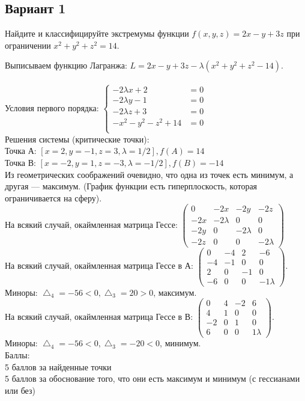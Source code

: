 \documentclass[addpoints, answers]{exam} %
\begin{document}
\subsection{Вариант 1}
\begin{questions}
\question[10] Найдите и классифицируйте экстремумы функции $f(x,y,z)=2x-y+3z$ при ограничении $x^2+y^2+z^2=14$.\\
\begin{solution}

Выписываем функцию Лагранжа: $L=2x-y+3z-\lambda (x^2+y^2+z^2-14)$.\\\\
Условия первого порядка:
$\left\{\begin{aligned}
-2\lambda x+2&=0\\
-2\lambda y-1&=0\\
-2\lambda z+3&=0\\
-x^2-y^2-z^2+14&=0\\
\end{aligned}\right.$\\
Решения системы (критические точки): \\
Точка А: $\left[ x=2,y=-1,z=3,\lambda=1/2\right], f(A)=14$\\
Точка В: $\left[ x=-2,y=1,z=-3,\lambda=-1/2\right], f(B)=-14$\\
Из геометрических соображений очевидно, что одна из точек есть минимум, а другая --- максимум. (График функции есть гиперплоскость, которая ограничивается на сферу).\\
На всякий случай, окаймленная матрица Гессе:
$\left(\begin{array}{cccc}
0 & -2x & -2y & -2z\\
-2x & -2\lambda & 0 & 0\\
-2y & 0 & -2\lambda & 0\\
-2z & 0 & 0 & -2\lambda
\end{array}\right)$\\
На всякий случай, окаймленная матрица Гессе в А: 
$\left(\begin{array}{cccc}
0 & -4 & 2 & -6\\
-4 & -1 & 0 & 0\\
2 & 0 & -1 & 0\\
-6 & 0 & 0 & -1\lambda
\end{array}\right)$.\\
Миноры: $\bigtriangleup_4=-56<0, \bigtriangleup_3=20>0$, максимум.\\
На всякий случай, окаймленная матрица Гессе в В: 
$\left(\begin{array}{cccc}
0 & 4 & -2 & 6\\
4 & 1 & 0 & 0\\
-2 & 0 & 1 & 0\\
6 & 0 & 0 & 1\lambda
\end{array}\right)$.\\
Миноры: $\bigtriangleup_4=-56<0, \bigtriangleup_3=-20<0$, минимум.\\
Баллы:\\
5 баллов за найденные точки\\
5 баллов за обоснование того, что они есть максимум и минимум (с гессианами или без)


\end{solution}
\end{questions}
\end{document}
